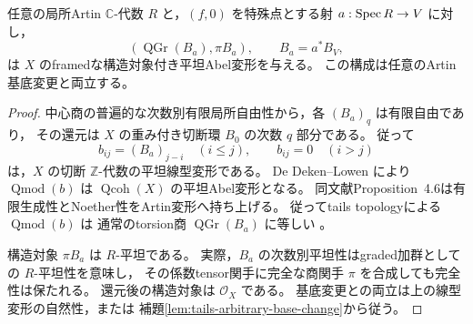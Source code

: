 \begin{lemma}[Artin中心商の平坦Abel変形]
\label{lem:simultaneous-artin-abel-family}
任意の局所Artin $\mathbb C$-代数 $R$ と，$(f,0)$ を特殊点とする射
$a:\operatorname{Spec} R\to V$ に対し，
\[
 (\operatorname{QGr}(B_a),\pi B_a),\qquad B_a=a^*B_V,
\]
は $X$ のframedな構造対象付き平坦Abel変形を与える。
この構成は任意のArtin基底変更と両立する。
\end{lemma}
\begin{proof}
中心商の普遍的な次数別有限局所自由性から，各 $(B_a)_q$ は有限自由であり，
その還元は $X$ の重み付き切断環 $B_0$ の次数 $q$ 部分である。
従って
\[
 b_{ij}=(B_a)_{j-i}\quad(i\le j),\qquad b_{ij}=0\quad(i>j)
\]
は，$X$ の切断 $\mathbb Z$-代数の平坦線型変形である。
De Deken--Lowen \cite[Proposition~4.4, p.~495]{DDL2011}により
$\operatorname{Qmod}(b)$ は $\operatorname{Qcoh}(X)$ の平坦Abel変形となる。
同文献Proposition~4.6は有限生成性とNoether性をArtin変形へ持ち上げる。
従ってtails topologyによる $\operatorname{Qmod}(b)$ は
通常のtorsion商 $\operatorname{QGr}(B_a)$ に等しい
\cite[\S3.1, \S3.3]{DDL2011}。

構造対象 $\pi B_a$ は $R$-平坦である。
実際，$B_a$ の次数別平坦性はgraded加群としての $R$-平坦性を意味し，
その係数tensor関手に完全な商関手 $\pi$ を合成しても完全性は保たれる。
還元後の構造対象は $\mathcal O_X$ である。
基底変更との両立は上の線型変形の自然性，または
補題\ref{lem:tails-arbitrary-base-change}から従う。
\end{proof}

